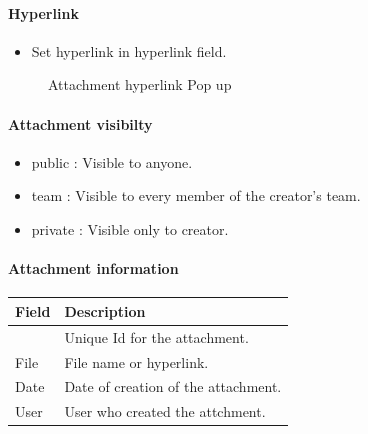 \documentclass[letterpaper,10pt,english]{sphinxmanual}
\begin{document}
\paragraph{Hyperlink}
\begin{itemize}
\item {} 
Set hyperlink in hyperlink field.

\end{itemize}
\begin{figure}[htbp]
\centering
\capstart

\caption{Attachment hyperlink Pop up}\end{figure}
\paragraph{Attachment visibilty}
\begin{itemize}
\item {} 
public : Visible to anyone.

\item {} 
team : Visible to every member of the creator’s team.

\item {} 
private :  Visible only to creator.

\end{itemize}
\paragraph{Attachment information}

\begin{tabulary}{\linewidth}{|l|l|}
\hline
\textsf{\relax 
Field
} & \textsf{\relax 
Description
}\\
\hline
{\hyperref[Glossary:term-id]{\emph{}}}
 & 
Unique Id for the attachment.
\\
\hline
File
 & 
File name or hyperlink.
\\
\hline
Date
 & 
Date of creation of the attachment.
\\
\hline
User
 & 
User who created the attchment.
\\
\hline\end{tabulary}
\end{document}
